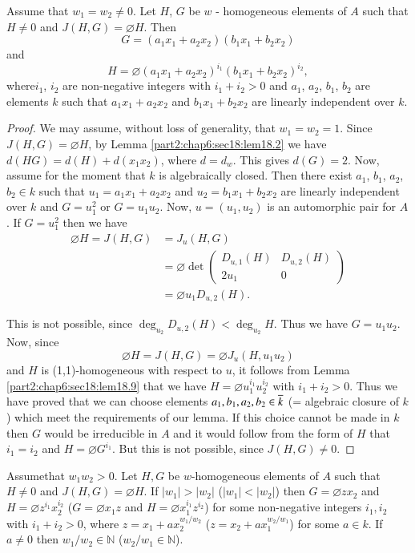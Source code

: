\begin{lemma}\label{part2:chap6:sec18:lem18.10}
  Assume that $w_1 = w_2 \neq 0$. Let $H$, $G$ be $w$ - homogeneous
  elements of $A$ such that $H \neq 0$ and $J(H, G)= \diameter
  H$. Then
$$
G= (a_1 x_1 +a_2 x_2) (b_1 x_1 + b_2 x_2)
$$
and 
$$
H= \diameter (a_1 x_1 + a_2 x_2)^{i_1} (b_1 x_1 + b_2 x_2)^{i_2},
$$
where\pageoriginale $i_1$, $i_2$ are non-negative integers with $i_1+
i_2>0$ and $a_1$, $a_2$, $b_1$, $b_2$ are elements $k$ such that $a_1
x_1 + a_2 x_2$ and $b_1 x_1+ b_2 x_2$ are linearly independent over
$k$.  
\end{lemma}

\begin{proof}
  We may assume, without loss of generality, that $w_1= w_2 =1$. Since
  $J(H, G)=\diameter H$, by Lemma \ref{part2:chap6:sec18:lem18.2} we
  have $d(HG)= d(H)+ d(x_1 x_2)$, where $d= d_w$. This gives
  $d(G)=2$. Now, assume for the moment that $k$ is algebraically
  closed. Then there exist $a_1$, $b_1$, $a_2$, $b_2 \in k$ such that
  $u_1= a_1 x_1+ a_2 x_2$ and $u_2 = b_1 x_1 + b_2 x_2$ are linearly
  independent over $k$ and $G= u_1^2$ or $G= u_1 u_2$. Now, $u = (u_1,
  u_2)$ is an automorphic pair for $A$. If $G= u_1^2$ then we have
\begin{align*}
  \diameter H = J(H, G) & = J_u (H, G)\\
  & = \diameter \det 
  \begin{pmatrix}
    D_{u, 1} (H) & D_{u, 2} (H)\\
    2u_1 & 0
  \end{pmatrix}\\
  & = \diameter u_1 D_{u, 2}(H).
\end{align*}

This is not possible, since $\deg_{u_2} D_{u, 2}(H)< \deg_{u_2}
H$. Thus we have $G= u_1 u_2$. Now, since
$$
\diameter H = J(H, G) = \diameter J_u (H, u_1 u_2)
$$
and $H$ is (1,1)-homogeneous with respect to $u$, it follows from
Lemma \ref{part2:chap6:sec18:lem18.9} that we have $H= \diameter
u_1^{i_1} u_2^{i_2}$ with $i_1 + i_2 > 0$. Thus we have proved that we
can choose elements $a_1, b_1, a_2, b_2\in \overline{k}$ (= algebraic
closure of $k$) which meet the requirements of our lemma. If this
choice cannot be made in $k$ then $G$ would be irreducible in $A$ and
it would follow from the form of $H$ that $i_1= i_2$ and $H= \diameter
G^{i_1}$. But this is not possible, since $J(H, G)\neq 0$.
\end{proof}

\begin{lemma}\label{part2:chap6:sec18:lem18.11}
  Assume\pageoriginale that $w_1 w_2 > 0$. Let $H, G$ be $w$-homogeneous elements of
  $A$ such that $H \neq 0$ and $J(H, G)= \diameter H$. If $|w_1|>
  |w_2|$ (\resp $|w_1|< |w_2|$) then $G= \diameter z x_2$ and $H=
  \diameter z^{i_1}x_2^{i_2}$ (\resp $G= \diameter x_1 z$ and $H=
  \diameter x_1^{i_1} z^{i_2}$) for some non-negative integers $i_1,
  i_2$ with $i_1 + i_2 > 0$, where $z= x_1 + ax_2^{w_1/w_2}$ (\resp $z=
  x_2 + a x_1^{w_2/w_1}$) for some $a \in k$. If $a \neq 0$ then
  $w_1/w_2 \in \mathbb{N}$ (\resp $w_2/w_1 \in \mathbb{N}$).
\end{lemma}

